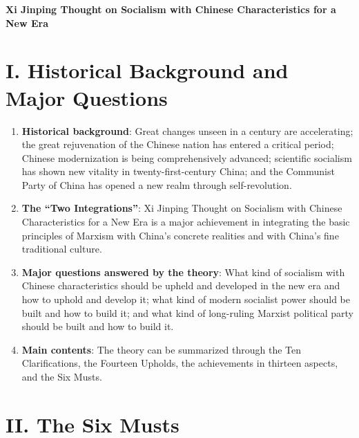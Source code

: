 \documentclass[11pt,a4paper]{ctexart}
\begin{document}
\begin{center}
    {\Large \textbf{Xi Jinping Thought on Socialism with Chinese Characteristics for a New Era}}
\end{center}

\section{I. Historical Background and Major Questions}

\begin{enumerate}[leftmargin=2em]
    \item \textbf{Historical background}: Great changes unseen in a century are accelerating; the great rejuvenation of the Chinese nation has entered a critical period; Chinese modernization is being comprehensively advanced; scientific socialism has shown new vitality in twenty-first-century China; and the Communist Party of China has opened a new realm through self-revolution.
    \item \textbf{The ``Two Integrations''}: Xi Jinping Thought on Socialism with Chinese Characteristics for a New Era is a major achievement in integrating the basic principles of Marxism with China's concrete realities and with China's fine traditional culture.
    \item \textbf{Major questions answered by the theory}: What kind of socialism with Chinese characteristics should be upheld and developed in the new era and how to uphold and develop it; what kind of modern socialist power should be built and how to build it; and what kind of long-ruling Marxist political party should be built and how to build it.
    \item \textbf{Main contents}: The theory can be summarized through the Ten Clarifications, the Fourteen Upholds, the achievements in thirteen aspects, and the Six Musts.
\end{enumerate}

\section{II. The Six Musts}
\end{document}
